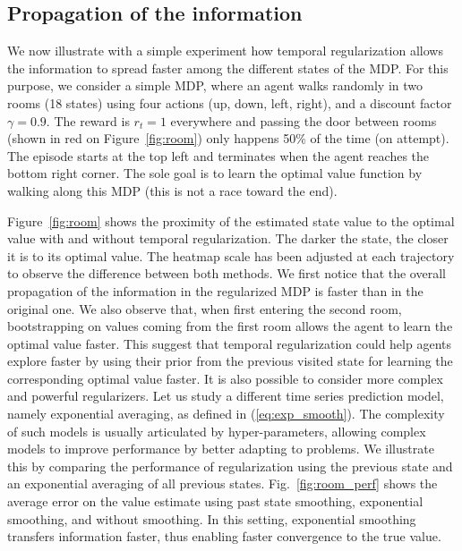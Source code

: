 \subsection{Propagation of the information}
We now illustrate with a simple experiment how temporal regularization allows the information to spread faster among the different states of the MDP. For this purpose, we consider a simple MDP, where an agent walks randomly in two rooms (18 states) using four actions (up, down, left, right), and a discount factor $\gamma=0.9$. The reward is $r_t=1$ everywhere and passing the door between rooms (shown in red on Figure~\ref{fig:room}) only happens 50\% of the time (on attempt). The episode starts at the top left and terminates when the agent reaches the bottom right corner. The sole goal is to learn the optimal value function by walking along this MDP (this is not a race toward the end).

Figure~\ref{fig:room} shows the proximity of the estimated state value to the optimal value with and without temporal regularization. The darker the state, the closer it is to its optimal value. The heatmap scale has been adjusted at each trajectory to observe the difference between both methods.
We first notice that the overall propagation of the information in the regularized MDP is faster than in the original one. We also observe that, when first entering the second room, bootstrapping on values coming from the first room allows the agent to learn the optimal value faster. This suggest that temporal regularization could help agents explore faster by using their prior from the previous visited state for learning the corresponding optimal value faster. It is also possible to consider more complex and powerful regularizers. Let us study a different time series prediction model, namely exponential averaging, as defined in (\ref{eq:exp_smooth}). The complexity of such models is usually articulated by hyper-parameters, allowing complex models to improve performance by better adapting to problems. We illustrate this by comparing the performance of regularization using the previous state and an exponential averaging of all previous states. Fig.~\ref{fig:room_perf} shows the average error on the value estimate using past state smoothing, exponential smoothing, and without smoothing. In this setting, exponential smoothing transfers information faster, thus enabling faster convergence to the true value.


